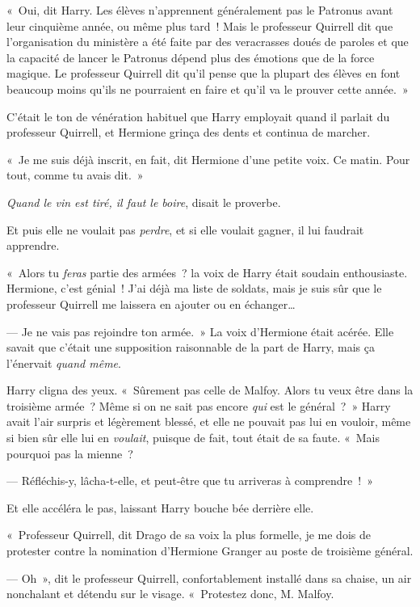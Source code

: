 «~Oui, dit Harry. Les élèves n'apprennent généralement pas le Patronus avant leur cinquième année, ou même plus tard~! Mais le professeur Quirrell dit que l'organisation du ministère a été faite par des veracrasses doués de paroles et que la capacité de lancer le Patronus dépend plus des émotions que de la force magique. Le professeur Quirrell dit qu'il pense que la plupart des élèves en font beaucoup moins qu'ils ne pourraient en faire et qu'il va le prouver cette année.~»

C'était le ton de vénération habituel que Harry employait quand il parlait du professeur Quirrell, et Hermione grinça des dents et continua de marcher.

«~Je me suis déjà inscrit, en fait, dit Hermione d'une petite voix. Ce matin. Pour tout, comme tu avais dit.~»

\emph{Quand le vin est tiré, il faut le boire}, disait le proverbe.

Et puis elle ne voulait pas \emph{perdre}, et si elle voulait gagner, il lui faudrait apprendre.

«~Alors tu \emph{feras} partie des armées~? la voix de Harry était soudain enthousiaste. Hermione, c'est génial~! J'ai déjà ma liste de soldats, mais je suis sûr que le professeur Quirrell me laissera en ajouter ou en échanger…

--- Je ne vais pas rejoindre ton armée.~» La voix d'Hermione était acérée. Elle savait que c'était une supposition raisonnable de la part de Harry, mais ça l'énervait \emph{quand même}.

Harry cligna des yeux. «~Sûrement pas celle de Malfoy. Alors tu veux être dans la troisième armée~? Même si on ne sait pas encore \emph{qui} est le général~?~» Harry avait l'air surpris et légèrement blessé, et elle ne pouvait pas lui en vouloir, même si bien sûr elle lui en \emph{voulait}, puisque de fait, tout était de sa faute. «~Mais pourquoi pas la mienne~?

--- Réfléchis-y, lâcha-t-elle, et peut-être que tu arriveras à comprendre~!~»

Et elle accéléra le pas, laissant Harry bouche bée derrière elle.

\later

«~Professeur Quirrell, dit Drago de sa voix la plus formelle, je me dois de protester contre la nomination d'Hermione Granger au poste de troisième général.

--- Oh~», dit le professeur Quirrell, confortablement installé dans sa chaise, un air nonchalant et détendu sur le visage. «~Protestez donc, M. Malfoy.

